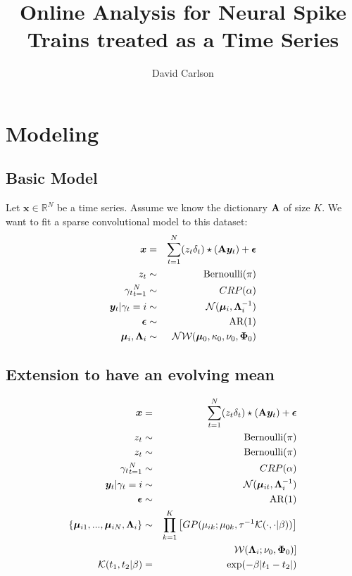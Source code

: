 \documentclass{article} %
\newcommand{\beqs}{\begin{eqnarray}}
\newcommand{\eeqs}{\end{eqnarray}}
\newcommand{\Amat}{{\bf A}}
\newcommand{\xv}{\boldsymbol{x}}
\newcommand{\yv}{\boldsymbol{y}}
\newcommand{\Lambdamat}{\boldsymbol{\Lambda}}
\newcommand{\Phimat}{\boldsymbol{\Phi}}
\newcommand{\epsilonv}{\boldsymbol{\epsilon}}
\newcommand{\muv}{\boldsymbol{\mu}}
\begin{document}
 
\title{Online Analysis for Neural Spike Trains treated as a Time Series}
\author{David Carlson}
\maketitle
\section{Modeling}
\subsection{Basic Model}
Let $\xv\in\mathbb{R}^N$ be a time series.  Assume we know the dictionary $\Amat$ of size $K$.  We want to fit a sparse convolutional model to this dataset:
\beqs
\xv&=&\sum_{t=1}^{N}(z_t\delta_t)\star (\Amat\yv_t)+\epsilonv\\
z_t&\sim&\text{Bernoulli}(\pi)\\
{\gamma_t}_{t=1}^{N}&\sim&CRP(\alpha)\\
\yv_t|\gamma_t=i&\sim&\mathcal{N}(\muv_i,\Lambdamat_i^{-1})\\
\epsilonv&\sim&\text{AR}(1)\\
{\muv_i,\Lambdamat_i}&\sim&\mathcal{NW}(\muv_0,\kappa_0,\nu_0,\Phimat_0)
\eeqs
\subsection{Extension to have an evolving mean}
\beqs
\xv&=&\sum_{t=1}^{N}(z_t\delta_t)\star (\Amat\yv_t)+\epsilonv\\
z_t&\sim&\text{Bernoulli}(\pi)\\
z_t&\sim&\text{Bernoulli}(\pi)\\
{\gamma_t}_{t=1}^{N}&\sim&CRP(\alpha)\\
\yv_t|\gamma_t=i&\sim&\mathcal{N}(\muv_{it},\Lambdamat_i^{-1})\\
\epsilonv&\sim&\text{AR}(1)\\
\{\muv_{i1},...,\muv_{iN},\Lambdamat_i\}&\sim&\prod_{k=1}^{K}\left[GP(\mu_{ik};\mu_{0k},\tau^{-1}\mathcal{K}(\cdot,\cdot|\beta))\right]\\
&&\mathcal{W}(\Lambdamat_i;\nu_0,\Phimat_0)]\\
\mathcal{K}(t_1,t_2|\beta)&=&\exp(-\beta |t_1-t_2|)
\eeqs 
\end{document}
